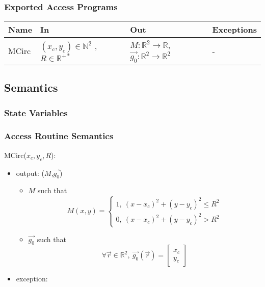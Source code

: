 \documentclass[12pt, titlepage]{article}
\begin{document}
\subsubsection{Exported Access Programs}

\begin{center}
\begin{tabular}{p{2cm} p{4cm} p{4cm} p{2cm}}
\hline
\textbf{Name} & \textbf{In} & \textbf{Out} & \textbf{Exceptions} \\
\hline
MCirc & $(x_c,y_c) \in \mathbb{N}^2$ , $R \in \mathbb{R}^{+*}$ & $M:\mathbb{R}^2\rightarrow\mathbb{R}$, $\overrightarrow{g_0} :\mathbb{R}^2\rightarrow\mathbb{R}^2$ & - \\
\hline
\end{tabular}
\end{center}

\subsection{Semantics}

\subsubsection{State Variables}


\subsubsection{Access Routine Semantics}

\noindent MCirc($x_c,y_c,R$):
\begin{itemize} 
\item output: ($M$,$\overrightarrow{g_0}$)
	\begin{itemize}
	\item $M$ such that
	\begin{equation*}
	M(x,y)=\begin{cases}
	1, \ (x-x_c)^2+(y-y_c)^2\leq R^2 \\
	0, \ (x-x_c)^2+(y-y_c)^2> R^2
	\end{cases}
	\end{equation*}
	\item $\overrightarrow{g_0}$ such that
	\begin{equation*}
	\forall \vec{r} \in \mathbb{R}^2, \ \overrightarrow{g_0}(\vec{r})=\begin{bmatrix}
	x_c\\
	y_c
	\end{bmatrix}
	\end{equation*}
	\end{itemize}
\item exception:  
\end{itemize}
\end{document}

